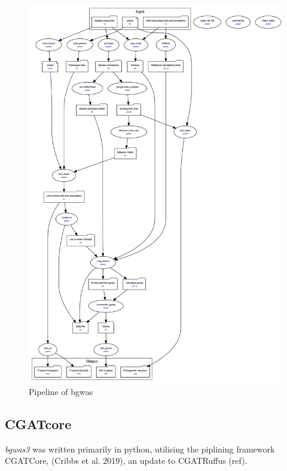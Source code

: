 \documentclass[]{DissertateUSU}
\begin{document}
\begin{figure}

{\centering \includegraphics[height=0.9\textheight]{_static/pipe} 

}

\caption{\label{fig:pipe}Pipeline of bgwas}\label{fig:unnamed-chunk-1}
\end{figure}

\hypertarget{cgatcore}{%
\subsection{CGATcore}\label{cgatcore}}

\emph{bgwas3} was written primarily in python, utilising the piplining
framework CGATCore, (Cribbs et al. 2019), an update to CGATRuffus (ref).
\end{document}
